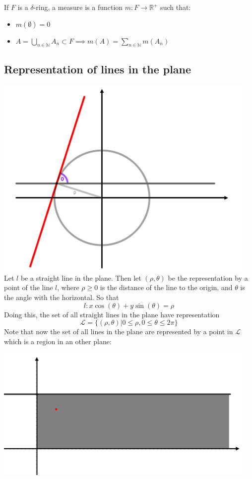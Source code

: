 \documentclass[a4paper]{article}
\begin{document}
If $F$ is a $\delta$-ring, a measure is a function $m: F \to \mathbb{R}^{+}$ such that:
\begin{itemize}
\item $m(\emptyset) = 0$
\item $A=\bigcup\limits_{n \in \mathbb{N}} A_n \subset F \implies m(A)=\sum\limits_{n \in \mathbb{N}} m(A_n)$
\end{itemize}

\subsection{Representation of lines in the plane}
\includegraphics[width=360pt]{img/figureLineRepr.png}
Let $l$ be a straight line in the plane.
Then let $(\rho, \theta)$ be the representation by a point of the line $l$, where $\rho \geq 0$ is the distance of the line to the origin, and $\theta$ is the angle with the horizontal. So that 
$$l: x\cos(\theta) + y\sin(\theta) = \rho$$
Doing this, the set of all straight lines in the plane have representation 
$$\mathscr{L} = \{(\rho, \theta)  |  0 \leq \rho, 0 \leq \theta \leq 2\pi \}$$
Note that now the set of all lines in the plane are represented by a point in $\mathscr{L}$ which is a region in an other plane:

\includegraphics[width=360pt]{img/figureSetLines.png}
\end{document}
